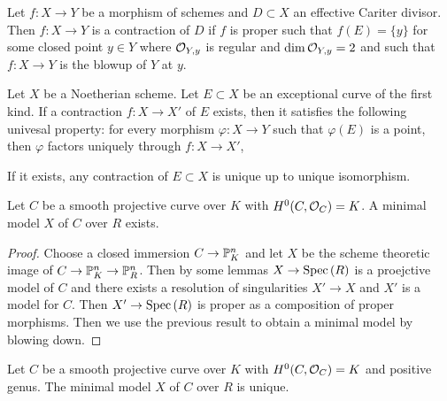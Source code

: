 \documentclass[12pt]{article}
\begin{document}
\begin{remark}
Let $f : X \to Y$ be a morphism of schemes and $D \subset X$ an effective Cariter divisor. Then $f : X \to Y$ is a contraction of $D$ if $f$ is proper such that $f(E) = \{ y \}$ for some closed point $y \in Y$ where $\stalk{Y}{y}$ is regular and $\dim{\stalk{Y}{y}} = 2$ and such that $f : X \to Y$ is the blowup of $Y$ at $y$. 
\end{remark}

\begin{lemma}[0C5J]
Let $X$ be a Noetherian scheme. Let $E \subset X$ be an exceptional curve of the first kind. If a contraction $f : X \to X'$ of $E$ exists, then it satisfies the following univesal property: for every morphism $\varphi : X \to Y$ such that $\varphi(E)$ is a point, then $\varphi$ factors uniquely through $f : X \to X'$,
\begin{center}
\end{center}
\end{lemma}

\begin{corollary}
If it exists, any contraction of $E \subset X$ is unique up to unique isomorphism. 
\end{corollary}

\begin{proposition}
Let $C$ be a smooth projective curve over $K$ with $H^0(C, \struct{C}) = K$. A minimal model $X$ of $C$ over $R$ exists.
\end{proposition}

\begin{proof}
Choose a closed immersion $C \to \P^n_K$ and let $X$ be the scheme theoretic image of $C \to \P^n_K \to \P^n_R$. Then by some lemmas $X \to \Spec{R}$ is a proejctive model of $C$ and there exists a resolution of singularities $X' \to X$ and $X'$ is a model for $C$. Then $X' \to \Spec{R}$ is proper as a composition of proper morphisms. Then we use the previous result to obtain a minimal model by blowing down.  
\end{proof}

\begin{proposition}
Let $C$ be a smooth projective curve over $K$ with $H^0(C, \struct{C}) = K$ and positive genus. The minimal model $X$ of $C$ over $R$ is unique.
\end{proposition}
\end{document}
